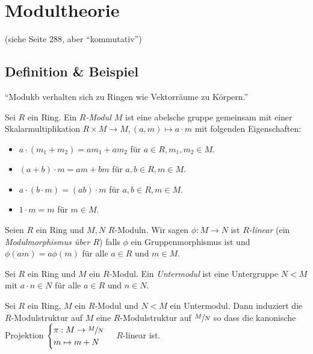 \graphicspath{{Images/}}

\chapter{Modultheorie}
(siehe Seite $288$, aber \enquote{kommutativ})

\section{Definition \& Beispiel}
\enquote{Modukb verhalten sich zu Ringen wie Vektorräume zu Körpern.}

\begin{definition}
	Sei $R$ ein Ring. Ein \emph{$R$-Modul $M$} ist eine abelsche gruppe gemeinsam mit einer Skalarmultiplikation $R \times M \to M, (a,m) \mapsto a \cdot m$
	mit folgenden Eigenschaften:
	\begin{itemize}
		\item $a \cdot (m_1 + m_2) = a m_1 + a m_2$ für $a \in R, m_1,m_2 \in M$.
		\item $(a+b) \cdot m = a m + b m$ für $a,b \in R, m \in M$.
		\item $a \cdot (b \cdot m) = (a b ) \cdot m$ für $a,b \in R, m \in M$.
		\item $1 \cdot m = m$ für $m \in M$.
	\end{itemize}
\end{definition}

\begin{definition}
	Seien $R$ ein Ring und $M,N$ $R$-Moduln. Wir sagen $\phi: M \to N$ ist \emph{$R$-linear} (ein \emph{Modulmorphismus über $R$})
	falls $\phi$ ein Gruppenmorphismus ist und $\phi(a m) = a \phi(m)$ für alle $a \in R$ und $m \in M$.
\end{definition}

\begin{definition}
	Sei $R$ ein Ring und $M$ ein $R$-Modul. Ein \emph{Untermodul} ist eine Untergruppe $N < M$ mit $a \cdot n \in N$ für alle $a \in R$ und $n \in N$.
\end{definition}

\begin{lemma}
	Sei $R$ ein Ring, $M$ ein $R$-Modul und $N < M$ ein Untermodul. Dann induziert die $R$-Modulstruktur auf $M$ eine $R$-Modulstruktur auf $\sfrac{M}{N}$ so dass
	die kanonische Projektion $\begin{cases}
		\pi: M \to \sfrac{M}{N}\\ m \mapsto m+N
	\end{cases}$ $R$-linear ist.
\end{lemma}

